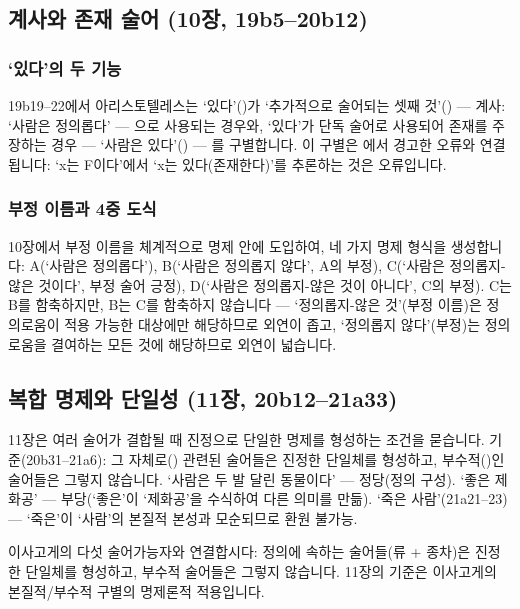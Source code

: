 \documentclass[12pt, a4paper]{article}
\begin{document}
\subsection{계사와 존재 술어 (10장, 19b5--20b12)}

\subsubsection{`있다'의 두 기능}

19b19--22에서 아리스토텔레스는 `있다'()가 `추가적으로 술어되는 셋째 것'() --- 계사: `사람은 정의롭다' --- 으로 사용되는 경우와, `있다'가 단독 술어로 사용되어 존재를 주장하는 경우 --- `사람은 있다'() --- 를 구별합니다. 이 구별은 에서 경고한 오류와 연결됩니다: `x는 F이다'에서 `x는 있다(존재한다)'를 추론하는 것은 오류입니다.

\subsubsection{부정 이름과 4중 도식}

10장에서 부정 이름을 체계적으로 명제 안에 도입하여, 네 가지 명제 형식을 생성합니다: A(`사람은 정의롭다'), B(`사람은 정의롭지 않다', A의 부정), C(`사람은 정의롭지-않은 것이다', 부정 술어 긍정), D(`사람은 정의롭지-않은 것이 아니다', C의 부정). C는 B를 함축하지만, B는 C를 함축하지 않습니다 --- `정의롭지-않은 것'(부정 이름)은 정의로움이 적용 가능한 대상에만 해당하므로 외연이 좁고, `정의롭지 않다'(부정)는 정의로움을 결여하는 모든 것에 해당하므로 외연이 넓습니다.

\subsection{복합 명제와 단일성 (11장, 20b12--21a33)}

11장은 여러 술어가 결합될 때 진정으로 단일한 명제를 형성하는 조건을 묻습니다. 기준(20b31--21a6): 그 자체로() 관련된 술어들은 진정한 단일체를 형성하고, 부수적()인 술어들은 그렇지 않습니다. `사람은 두 발 달린 동물이다' --- 정당(정의 구성). `좋은 제화공' --- 부당(`좋은'이 `제화공'을 수식하여 다른 의미를 만듦). `죽은 사람'(21a21--23) --- `죽은'이 `사람'의 본질적 본성과 모순되므로 환원 불가능.

이사고게의 다섯 술어가능자와 연결합시다: 정의에 속하는 술어들(류 + 종차)은 진정한 단일체를 형성하고, 부수적 술어들은 그렇지 않습니다. 11장의 기준은 이사고게의 본질적/부수적 구별의 명제론적 적용입니다.
\end{document}
